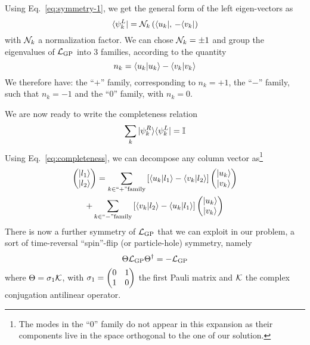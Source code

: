 Using Eq.~\eqref{eq:symmetry-1}, we get the general form of the left
eigen-vectors as
%
\begin{equation}\label{eq:psi-L}
  \langle \psi_k^L \vert = {\cal N}_k \left( \langle u_k \vert,\, -\langle v_k \vert \right)
\end{equation}
% 
with ${\cal N}_k$ a normalization factor.  We can chose
${\cal N}_k = \pm 1$ and group the eigenvalues of $\mathcal{L}_{\text{GP}}$
into 3 families, according to the quantity
%
\begin{equation}\label{eq:norms}
  n_k = \langle u_k \vert u_k \rangle - \langle v_k \vert v_k \rangle
\end{equation}
% 
We therefore have: the ``$+$'' family, corresponding to $n_k=+1$, the
``$-$'' family, such that $n_k=-1$ and the ``$0$'' family, with
$n_k=0$.


We are now ready to write the completeness relation
%
\begin{equation}\label{eq:completeness}
  \sum_k \vert \psi_k^R \rangle \langle \psi_k^L \vert = \mathbb{I}
\end{equation}
% 
Using Eq.~\eqref{eq:completeness}, we can decompose any column vector
as\footnote{The modes in the ``$0$'' family do not appear in this
  expansion as their components live in the space orthogonal to the one
  of our solution.}
%
\begin{multline}\label{eq:decomposition}
  \begin{pmatrix} \vert l_1 \rangle\\ \vert l_2 \rangle \end{pmatrix} = \sum_{k \in ``+" \mbox{\scriptsize family}} \left[\langle u_k \vert l_1 \rangle - \langle v_k \vert l_2 \rangle\right]\begin{pmatrix} \vert u_k \rangle\\ \vert v_k \rangle \end{pmatrix}\\
  + \sum_{k \in ``-" \mbox{\scriptsize family}} \left[\langle v_k \vert l_2 \rangle - \langle u_k \vert l_1 \rangle\right]\begin{pmatrix} \vert u_k \rangle\\ \vert v_k \rangle \end{pmatrix}
\end{multline}
% 
There is now a further symmetry of $\mathcal{L}_{\text{GP}}$ that we can
exploit in our problem, a sort of time-reversal ``spin''-flip (or
particle-hole) symmetry, namely
%
\begin{equation}\label{eq:symmetry-2}
   \Theta \mathcal{L}_{\text{GP}} \Theta^{\dagger} = -\mathcal{L}_{\text{GP}}
\end{equation}
%
where $\Theta = \sigma_1 \cal{K}$, with $\sigma_1 = \begin{pmatrix} 0 & 1\\ 1 & 0 \end{pmatrix}$
the first Pauli matrix and $\cal{K}$ the complex conjugation
antilinear operator.

